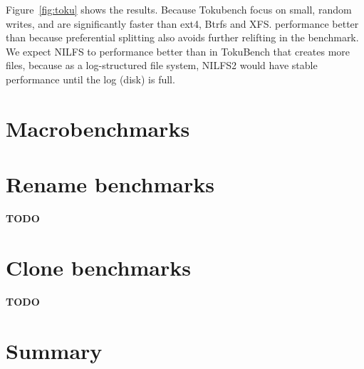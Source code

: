 Figure~\ref{fig:toku} shows the results.
Because Tokubench focus on small, random writes, \betrfsFour and \betrfsFive are
significantly faster than ext4, Btrfs and XFS.
\BetrfsFive performance better than \betrfsFour because preferential splitting
also avoids further relifting in the benchmark.
We expect NILFS to performance better than \betrfsFive in TokuBench that creates
more files,
because as a log-structured file system, NILFS2 would have stable performance
until the log (disk) is full.

\section{Macrobenchmarks}

\section{Rename benchmarks}

\textbf{TODO}

\section{Clone benchmarks}

\textbf{TODO}

\section{Summary}
